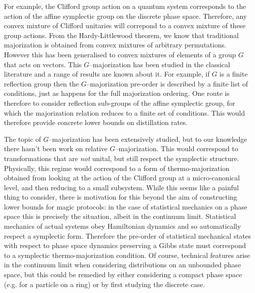 \documentclass[pra,
aps,
twocolumn,
superscriptaddress,
groupedaddress,
nofootinbib,
reprint
]{revtex4-1}
\begin{document}
  For example, the Clifford group action on a quantum system corresponds to the action of the affine symplectic group on the discrete phase space. Therefore, any convex mixture of Clifford unitaries will correpond to a convex mixture of these group actions. From the Hardy-Littlewood theorem, we know that traditional majorization is obtained from convex mixtures of arbitrary permutations. However this has been generalised to convex mixtures of elements of a group $G$ that acts on vectors. This $G$--majorization has been studied in the classical literature and a range of results are known about it. For example, if $G$ is a finite reflection group then the $G$--majorization pre-order is described by a finite list of conditions, just as happens for the full majorization ordering. One route is therefore to consider reflection sub-groups of the affine symplectic group, for which the majorization relation reduces to a finite set of conditions. This would therefore provide concrete lower bounds on distillation rates.
  
  The topic of $G$--majorization has been extensively studied, but to our knowledge there hasn't been work on relative $G$--majorization. This would correspond to transformations that are \emph{not} unital, but still respect the symplectic structure. Physically, this regime would correspond to a form of thermo-majorization obtained from looking at the action of the Clifford group at a micro-canonical level, and then reducing to a small subsystem. While this seems like a painful thing to consider, there is motivation for this beyond the aim of constructing lower bounds for magic protocols: in the case of statistical mechanics on a phase space this is precisely the situation, albeit in the continuum limit. Statistical mechanics of actual systems obey Hamiltonian dynamics and so automatically respect a symplectic form. Therefore the pre-order of statistical mechanical states with respect to phase space dynamics preserving a Gibbs state must correspond to a symplectic thermo-majorization condition. Of course, technical features arise in the continuum limit when considering distributions on an unbounded phase space, but this could be remedied by either considering a compact phase space (e.g. for a particle on a ring) or by first studying the discrete case.
\end{document}
